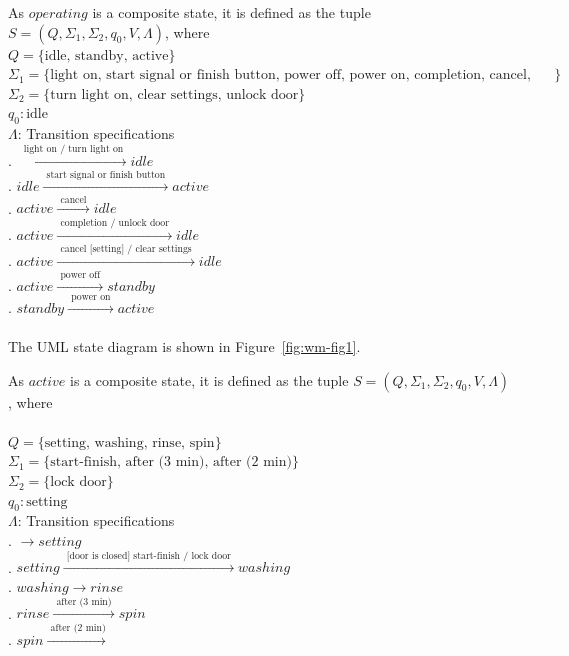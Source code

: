 \documentclass[12pt]{article}
\begin{document}
\begin{spacing}{1.5}
\noindent As $operating$ is a composite state, it is defined as the tuple $S = (Q, \Sigma_1, \Sigma_2, q_0, V, \Lambda)$, where\\
\noindent $Q = \{\text {idle, standby, active}\}$\\
\noindent $\Sigma_1 = \{\text {light on, start signal or finish button, power off, power on, completion, cancel, cancel [setting]}\}$\\ 
\noindent $\Sigma_2 = \{\text {turn light on, clear settings, unlock door}\}$\\
\noindent $q_0: \text{idle}$\\
\noindent $\Lambda$: Transition specifications\\
. $\xrightarrow {\text { light on / turn light on }} idle$\\
. $idle \xrightarrow {\text { start signal or finish button }} active$\\
. $active \xrightarrow {\text { cancel }} idle$\\
. $active \xrightarrow {\text { completion / unlock door }} idle$\\
. $active \xrightarrow {\text { cancel [setting] / clear settings }} idle$\\
. $active \xrightarrow {\text { power off }} standby$\\
. $standby \xrightarrow {\text { power on }} active$\\\\
\noindent The UML state diagram is shown in Figure~\ref{fig:wm-fig1}.\\
\newpage

\noindent As $active$ is a composite state, it is defined as the tuple $S = (Q, \Sigma_1, \Sigma_2, q_0, V, \Lambda)$, where\\\\
\noindent $Q = \{\text {setting, washing, rinse, spin}\}$\\
\noindent $\Sigma_1 = \{\text {start-finish, after (3 min), after (2 min)}\}$\\ 
\noindent $\Sigma_2 = \{\text {lock door}\}$\\
\noindent $q_0: \text{setting}$\\
\noindent $\Lambda$: Transition specifications\\
. $\xrightarrow {} setting$\\
. $setting \xrightarrow {\text { [door is closed] start-finish / lock door }} washing $\\
. $washing \xrightarrow {} rinse$\\
. $rinse \xrightarrow {\text { after (3 min) }} spin$\\
. $spin  \xrightarrow {\text { after (2 min)}}$\\


\end{spacing}
\end{document}

